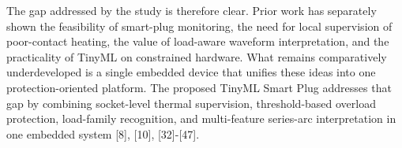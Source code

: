 The gap addressed by the study is therefore clear. Prior work has
separately shown the feasibility of smart-plug monitoring, the need for
local supervision of poor-contact heating, the value of load-aware
waveform interpretation, and the practicality of TinyML on constrained
hardware. What remains comparatively underdeveloped is a single embedded
device that unifies these ideas into one protection-oriented platform.
The proposed TinyML Smart Plug addresses that gap by combining
socket-level thermal supervision, threshold-based overload protection,
load-family recognition, and multi-feature series-arc interpretation in
one embedded system {[}8{]}, {[}10{]}, {[}32{]}-{[}47{]}.

